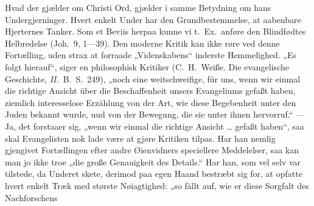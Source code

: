 \documentclass[12pt,a4paper]{book}
\begin{document}
Hvad der gjælder om Christi Ord, gjælder i samme Betydning om hans Undergjerninger. Hvert
enkelt Under har den Grundbestemmelse, at aabenbare Hjerternes Tanker. Som et Beviis herpaa
kunne vi t.\ Ex.\ anføre den Blindfødtes Helbredelse (Joh.\ 9, 1---39). Den moderne Kritik
kan ikke røre ved denne Fortælling, uden strax at forraade „Videnskabens“ inderste
Hemmelighed. „Es folgt hierauf“, siger en philosophisk Kritiker (C.\ H.\ Weiße. Die
evangelische Geschichte, \textit{II.}\ B.\ S.\ 249), „noch eine weitschweifige, für uns,
wenn wir einmal die richtige Ansicht über die Beschaffenheit unsers Evangeliums gefaßt
haben, ziemlich interesselose Erzählung von der Art, wie diese Begebenheit unter den Juden
bekannt wurde, uud von der Bewegung, die sie unter ihnen hervorruf.“ --- Ja, det forstaaer
sig, „wenn wir einmal die richtige Ansicht \dots{} gefaßt haben“, saa skal Evangelisten nok
lade være at gjøre Kritiken tilpas. Har han nemlig gjengivet Fortællingen efter andre
Øienvidners speciellere Meddelelser, saa kan man jo ikke troe „die große Genauigkeit des
Details.“ Har han, som vel selv var tilstede, da Underet skete, derimod paa egen Haand
bestræbt sig for, at opfatte hvert enkelt Træk med største Nøiagtighed: „so fällt auf, wie
er diese Sorgfalt des Nachforschens
\end{document}
